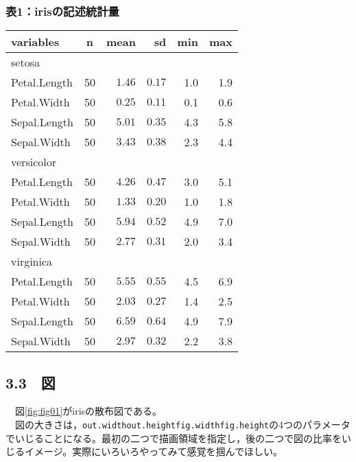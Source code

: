 \documentclass[
  a4paper]{ltjsarticle}
\begin{document}
\begingroup
{}

\hypertarget{ux88681irisux306eux8a18ux8ff0ux7d71ux8a08ux91cf}{%
\subsubsection{表1：irisの記述統計量}\label{ux88681irisux306eux8a18ux8ff0ux7d71ux8a08ux91cf}}

\captionsetup[table]{labelformat=empty,skip=1pt}
\begin{longtable}{lcrrrr}
\toprule
variables & n & mean & sd & min & max \\ 
\midrule
\multicolumn{1}{l}{setosa} \\ 
\midrule
Petal.Length & 50 & $1.46$ & $0.17$ & 1.0 & 1.9 \\ 
Petal.Width & 50 & $0.25$ & $0.11$ & 0.1 & 0.6 \\ 
Sepal.Length & 50 & $5.01$ & $0.35$ & 4.3 & 5.8 \\ 
Sepal.Width & 50 & $3.43$ & $0.38$ & 2.3 & 4.4 \\ 
\midrule
\multicolumn{1}{l}{versicolor} \\ 
\midrule
Petal.Length & 50 & $4.26$ & $0.47$ & 3.0 & 5.1 \\ 
Petal.Width & 50 & $1.33$ & $0.20$ & 1.0 & 1.8 \\ 
Sepal.Length & 50 & $5.94$ & $0.52$ & 4.9 & 7.0 \\ 
Sepal.Width & 50 & $2.77$ & $0.31$ & 2.0 & 3.4 \\ 
\midrule
\multicolumn{1}{l}{virginica} \\ 
\midrule
Petal.Length & 50 & $5.55$ & $0.55$ & 4.5 & 6.9 \\ 
Petal.Width & 50 & $2.03$ & $0.27$ & 1.4 & 2.5 \\ 
Sepal.Length & 50 & $6.59$ & $0.64$ & 4.9 & 7.9 \\ 
Sepal.Width & 50 & $2.97$ & $0.32$ & 2.2 & 3.8 \\ 
\bottomrule
\end{longtable}

\endgroup

\hypertarget{ux56f3}{%
\subsection{3.3　図}\label{ux56f3}}

　図\ref{fig:fig01}がirisの散布図である。\\
　図の大きさは，\texttt{out.width\textasciigrave{}\textasciigrave{}out.height\textasciigrave{}\textasciigrave{}fig.width\textasciigrave{}\textasciigrave{}fig.height}の4つのパラメータでいじることになる。最初の二つで描画領域を指定し，後の二つで図の比率をいじるイメージ。実際にいろいろやってみて感覚を掴んでほしい。
\end{document}
